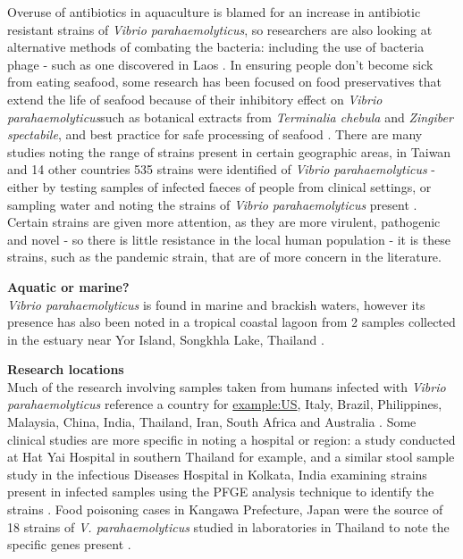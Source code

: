 \documentclass[]{book}
\theoremstyle{definition}
\theoremstyle{definition}
\theoremstyle{definition}
\theoremstyle{remark}
\begin{document}
Overuse of antibiotics in aquaculture is blamed for an increase in
antibiotic resistant strains of \emph{Vibrio parahaemolyticus}, so
researchers are also looking at alternative methods of combating the
bacteria: including the use of bacteria phage - such as one discovered
in Laos \citep{Elmahdi_2016, Higa_1999}. In ensuring people don't become
sick from eating seafood, some research has been focused on food
preservatives that extend the life of seafood because of their
inhibitory effect on \emph{Vibrio parahaemolyticus}such as botanical
extracts from \emph{Terminalia chebula} \citep{Kaewmane_2012} and
\emph{Zingiber spectabile}, and best practice for safe processing of
seafood \citep{Sivasothy_2013, Boonyawantang_2012}. There are many
studies noting the range of strains present in certain geographic areas,
in Taiwan and 14 other countries 535 strains were identified of
\emph{Vibrio parahaemolyticus} - either by testing samples of infected
faeces of people from clinical settings, or sampling water and noting
the strains of \emph{Vibrio parahaemolyticus} present
\citep{Wong_2007, Wootipoom_2007}. Certain strains are given more
attention, as they are more virulent, pathogenic and novel - so there is
little resistance in the local human population - it is these strains,
such as the pandemic strain, that are of more concern in the literature.

\textbf{Aquatic or marine?}\\
\emph{Vibrio parahaemolyticus} is found in marine and brackish waters,
however its presence has also been noted in a tropical coastal lagoon
from 2 samples collected in the estuary near Yor Island, Songkhla Lake,
Thailand \citep{Thongchankaew_2011}.

\textbf{Research locations}\\
Much of the research involving samples taken from humans infected with
\emph{Vibrio parahaemolyticus} reference a country for \url{example:US},
Italy, Brazil, Philippines, Malaysia, China, India, Thailand, Iran,
South Africa and Australia \citep{Elmahdi_2016}. Some clinical studies
are more specific in noting a hospital or region: a study conducted at
Hat Yai Hospital in southern Thailand \citep{Wootipoom_2007} for
example, and a similar stool sample study in the infectious Diseases
Hospital in Kolkata, India examining strains present in infected samples
using the PFGE analysis technique to identify the strains
\citep{Pazhani_2014}. Food poisoning cases in Kangawa Prefecture, Japan
were the source of 18 strains of \emph{V. parahaemolyticus} studied in
laboratories in Thailand to note the specific genes present
\citep{Okitsu_1997}.
\end{document}
